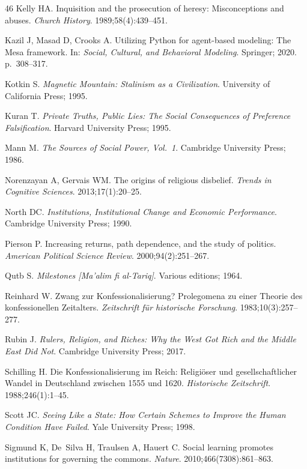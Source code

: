 \documentclass[12pt]{article}
\begin{document}
\begin{thebibliography}{46}
Kelly HA.
Inquisition and the prosecution of heresy: Misconceptions and abuses.
\textit{Church History}. 1989;58(4):439--451.

Kazil J, Masad D, Crooks A.
Utilizing Python for agent-based modeling: The Mesa framework.
In: \textit{Social, Cultural, and Behavioral Modeling}. Springer; 2020. p.~308--317.

Kotkin S.
\textit{Magnetic Mountain: Stalinism as a Civilization}.
University of California Press; 1995.

Kuran T.
\textit{Private Truths, Public Lies: The Social Consequences of Preference Falsification}.
Harvard University Press; 1995.

Mann M.
\textit{The Sources of Social Power, Vol.~1}.
Cambridge University Press; 1986.

Norenzayan A, Gervais WM.
The origins of religious disbelief.
\textit{Trends in Cognitive Sciences}. 2013;17(1):20--25.

North DC.
\textit{Institutions, Institutional Change and Economic Performance}.
Cambridge University Press; 1990.

Pierson P.
Increasing returns, path dependence, and the study of politics.
\textit{American Political Science Review}. 2000;94(2):251--267.

Qutb S.
\textit{Milestones [Ma'alim fi al-Tariq]}.
Various editions; 1964.

Reinhard W.
Zwang zur Konfessionalisierung? Prolegomena zu einer Theorie des konfessionellen Zeitalters.
\textit{Zeitschrift f\"{u}r historische Forschung}. 1983;10(3):257--277.

Rubin J.
\textit{Rulers, Religion, and Riches: Why the West Got Rich and the Middle East Did Not}.
Cambridge University Press; 2017.

Schilling H.
Die Konfessionalisierung im Reich: Religi\"{o}ser und gesellschaftlicher Wandel in Deutschland zwischen 1555 und 1620.
\textit{Historische Zeitschrift}. 1988;246(1):1--45.

Scott JC.
\textit{Seeing Like a State: How Certain Schemes to Improve the Human Condition Have Failed}.
Yale University Press; 1998.

Sigmund K, De~Silva H, Traulsen A, Hauert C.
Social learning promotes institutions for governing the commons.
\textit{Nature}. 2010;466(7308):861--863.


\end{thebibliography}
\end{document}
